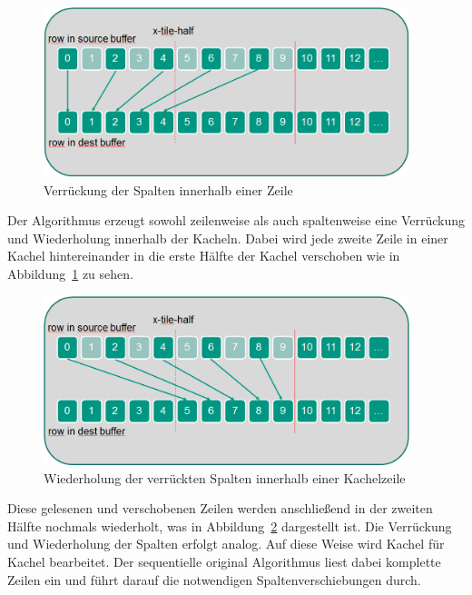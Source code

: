 \begin{figure}[h]
\begin{center}
\includegraphics[width=0.95\textwidth]{gtile1.png}
\end{center}
\caption{Verrückung der Spalten innerhalb einer Zeile}\label{fig:gtile1}
\end{figure}
Der Algorithmus erzeugt sowohl zeilenweise als auch spaltenweise eine Verrückung und Wiederholung innerhalb der Kacheln. Dabei wird jede zweite Zeile in einer Kachel hintereinander in die erste Hälfte der Kachel verschoben wie in Abbildung~\ref{fig:gtile1} zu sehen.\newline
\begin{figure}[h]
\begin{center}
\includegraphics[width=0.95\textwidth]{gtile2.png}
\end{center}
\caption{Wiederholung der verrückten Spalten innerhalb einer Kachelzeile}\label{fig:gtile2}
\end{figure}
Diese gelesenen und verschobenen Zeilen werden anschließend in der zweiten Hälfte nochmals wiederholt, was in Abbildung~\ref{fig:gtile2} dargestellt ist.\newline
Die Verrückung und Wiederholung der Spalten erfolgt analog. Auf diese Weise wird Kachel für Kachel bearbeitet. Der sequentielle original Algorithmus liest dabei komplette Zeilen ein und führt darauf die notwendigen Spaltenverschiebungen durch.

